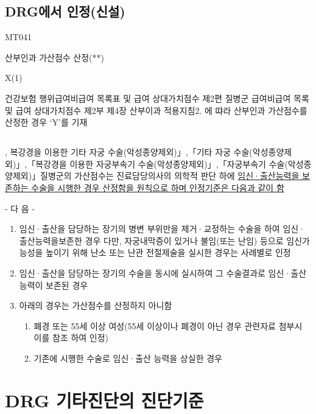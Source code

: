 \subsection{DRG에서 인정(신설)}
\begin{description}\tightlist
\item[구분코드] MT041
\item[특정내역] 산부인과 가산점수 산정(**)
\item[특정내역기재형식] X(1)
\item[설명] 건강보험 행위급여\cntrdot{}비급여 목록표 및 급여 상대가치점수 제2편 질병군 급여\cntrdot{}비급여 목록 및 급여 상대가치점수 제2부 제4장 산부이과 적용지침2. 에 땨라 산부인과 가산점수를 산정한 경우 `Y'를 기재
\end{description}

\subsection{}, 
복강경을 이용한 기타 자궁 수술(악성종양제외)」,「기타 자궁 수술(악성종양제외)」,「복강경을 이용한 자궁부속기 수술(악성종양제외)」,「자궁부속기 수술(악성종양제외)」질병군의 가산점수는 진료담당의사의 의학적 판단 하에 \uline{임신·출산능력을 보존하는 수술을 시행한 경우 산정함을 원칙으로 하며 인정기준은 다음과 같이 함}\par
- 다 음 -
\begin{enumerate}[가.]\tightlist
\item 임신·출산을 담당하는 장기의 병변 부위만을 제거·교정하는 수술을 하여 임신·출산능력을보존한 경우 다만, 자궁내막증이 있거나 불임(또는 난임) 등으로 임신가능성을 높이기 위해 난소 또는 난관 전절제술을 실시한 경우는 사례별로 인정
\item 임신·출산을 담당하는 장기의 수술을 동시에 실시하여 그 수술결과로 임신·출산능력이 보존된 경우
\item  아래의 경우는 가산점수를 산정하지 아니함
	\begin{enumerate}[(1)]\tightlist
	\item 폐경 또는 55세 이상 여성(55세 이상이나 폐경이 아닌 경우 관련자료 첨부시 이를 참조
하여 인정)
	\item 기존에 시행한 수술로 임신·출산 능력을 상실한 경우
	\end{enumerate}
\end{enumerate}	
\clearpage


\section{DRG 기타진단의 진단기준}
